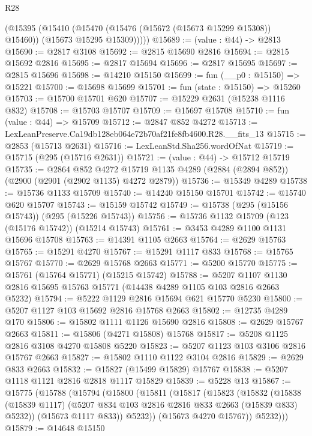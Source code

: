 \begin{lexlean}{R28}
\begin{coremodule}
        (@15395
          (@15410
            (@15470 (@15476 (@15672 (@15673 @15299 @15308)) @15460))
            (@15673 @15295 @15309)))))
@15689 := (value : @44) -> @2813
@15690 := @2817 @3108
@15692 := @2815 @15690 @2816
@15694 := @2815 @15692 @2816
@15695 := @2817 @15694
@15696 := @2817 @15695
@15697 := @2815 @15696
@15698 := @14210 @15150
@15699 := fun (__p0 : @15150) => @15221
@15700 := @15698 @15699
@15701 := fun (state : @15150) => @15260
@15703 := @15700 @15701 @620
@15707 := @15229 @2631 (@15238 @1116 @832)
@15708 := @15703 @15707
@15709 := @15697 @15708
@15710 := fun (value : @44) => @15709
@15712 := @2847 @852 @4272
@15713 := LexLeanPreserve.Ca19db128eb064e72b70af21fe8fb4600.R28.__fits_13
@15715 := @2853 (@15713 @2631)
@15716 := LexLeanStd.Sha256.wordOfNat
@15719 := @15715 (@295 (@15716 @2631))
@15721 := (value : @44) -> @15712 @15719
@15735 := @2864
    @852
    @4272
    @15719
    @1135
    @4289
    (@2884 (@2894 @852))
    (@2900 (@2901 (@2902 @1135) @4272 @2879))
@15736 := @15349 @4289
@15738 := @15736 @1133 @15709
@15740 := @14240 @15150 @15701
@15742 := @15740 @620 @15707
@15743 := @15159 @15742
@15749 := @15738 (@295 (@15156 @15743)) (@295 (@15226 @15743))
@15756 := @15736 @1132 @15709 (@123 (@15176 @15742)) (@15214 @15743)
@15761 := @3453 @4289 @1100 @1131 @15696 @15708
@15763 := @14391 @1105 @2663
@15764 := @2629 @15763
@15765 := @15291 @4270
@15767 := @15291 @1117 @833
@15768 := @15765 @15767
@15770 := @2629 @15768 @2663
@15771 := @5200 @15770
@15775 := @15761 (@15764 @15771) (@15215 @15742)
@15788 := @5207 @1107 @1130 @2816 @15695 @15763 @15771 (@14438 @4289 @1105 @103 @2816 @2663 @5232)
@15794 := @5222 @1129 @2816 @15694 @621 @15770 @5230
@15800 := @5207 @1127 @103 @15692 @2816 @15768 @2663
@15802 := @12735 @4289 @170
@15806 := @15802 @1111 @1126 @15690 @2816
@15808 := @2629 @15767 @2663
@15811 := @15806 (@4271 @15808) @15768
@15817 := @5208 @1125 @2816 @3108 @4270 @15808 @5220
@15823 := @5207 @1123 @103 @3106 @2816 @15767 @2663
@15827 := @15802 @1110 @1122 @3104 @2816
@15829 := @2629 @833 @2663
@15832 := @15827 (@15499 @15829) @15767
@15838 := @5207 @1118 @1121 @2816 @2818 @1117 @15829
@15839 := @5228 @13
@15867 := @15775
    (@15788
      (@15794
        (@15800
          (@15811
            (@15817
              (@15823
                (@15832
                  (@15838
                    (@15839 @1117)
                    (@5207 @834 @103 @2816 @2816 @833 @2663 (@15839 @833) @5232))
                  (@15673 @1117 @833))
                @5232))
            (@15673 @4270 @15767))
          @5232)))
@15879 := @14648
    @15150

\end{coremodule}
\end{lexlean}

